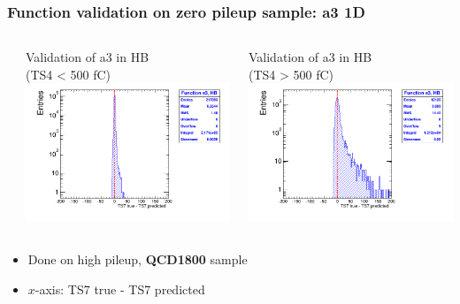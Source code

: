\documentclass[bigger]{beamer}
\providecommand{\alert}[1]{\textbf{#1}}
\begin{document}
\begin{frame}
\frametitle{Function validation on zero pileup sample: a3 1D}
\label{sec-3-2-16}
\begin{columns} %
\label{sec-3-2-16-1}
\begin{column}{0.55\textwidth}
\label{sec-3-2-16-1-1}

\centering
Validation of a3 in HB \\ (TS4 < 500 fC)
\includegraphics[width=\textwidth]{fig/crosscheck_1D_sample1800_a3_under500_ring0.png}
\end{column}
\begin{column}{0.55\textwidth}
\label{sec-3-2-16-1-2}

\centering
Validation of a3 in HB \\ (TS4 > 500 fC)
\includegraphics[width=\textwidth]{fig/crosscheck_1D_sample1800_a3_over500_ring0.png}
\end{column}
\end{columns}
\label{sec-3-2-16-2}
\begin{itemize}

\item Done on high pileup, \alert{QCD1800} sample
\label{sec-3-2-16-2-1}%

\item $x$-axis: TS7 true - TS7 predicted
\label{sec-3-2-16-2-2}%

\end{itemize} %
\end{frame}
\end{document}

